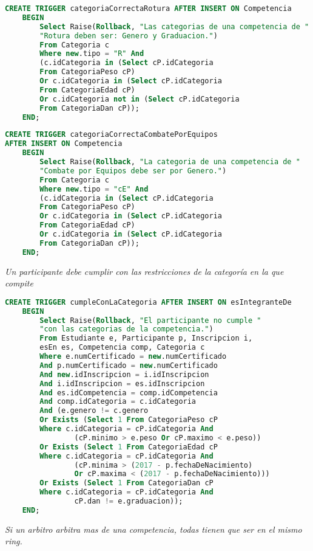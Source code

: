 \begin{lstlisting}[language=SQL]
CREATE TRIGGER categoriaCorrectaRotura AFTER INSERT ON Competencia
    BEGIN
        Select Raise(Rollback, "Las categorias de una competencia de "
        "Rotura deben ser: Genero y Graduacion.")
        From Categoria c
        Where new.tipo = "R" And
        (c.idCategoria in (Select cP.idCategoria 
        From CategoriaPeso cP)
        Or c.idCategoria in (Select cP.idCategoria 
        From CategoriaEdad cP)
        Or c.idCategoria not in (Select cP.idCategoria 
        From CategoriaDan cP));
    END;

\end{lstlisting}
\emph{
}

\begin{lstlisting}[language=SQL]
CREATE TRIGGER categoriaCorrectaCombatePorEquipos 
AFTER INSERT ON Competencia
    BEGIN
        Select Raise(Rollback, "La categoria de una competencia de "
        "Combate por Equipos debe ser por Genero.")
        From Categoria c
        Where new.tipo = "cE" And
        (c.idCategoria in (Select cP.idCategoria 
        From CategoriaPeso cP)
        Or c.idCategoria in (Select cP.idCategoria 
        From CategoriaEdad cP)
        Or c.idCategoria in (Select cP.idCategoria 
        From CategoriaDan cP));
    END;

\end{lstlisting}

\emph{Un participante debe cumplir con las restricciones de la categoría en la que compite}

\begin{lstlisting}[language=SQL]
CREATE TRIGGER cumpleConLaCategoria AFTER INSERT ON esIntegranteDe
    BEGIN
        Select Raise(Rollback, "El participante no cumple "
        "con las categorias de la competencia.")
        From Estudiante e, Participante p, Inscripcion i, 
        esEn es, Competencia comp, Categoria c
        Where e.numCertificado = new.numCertificado 
        And p.numCertificado = new.numCertificado 
        And new.idInscripcion = i.idInscripcion 
        And i.idInscripcion = es.idInscripcion 
        And es.idCompetencia = comp.idCompetencia 
        And comp.idCategoria = c.idCategoria
        And (e.genero != c.genero
        Or Exists (Select 1 From CategoriaPeso cP 
        Where c.idCategoria = cP.idCategoria And 
                (cP.minimo > e.peso Or cP.maximo < e.peso))
        Or Exists (Select 1 From CategoriaEdad cP 
        Where c.idCategoria = cP.idCategoria And 
                (cP.minima > (2017 - p.fechaDeNacimiento) 
                Or cP.maxima < (2017 - p.fechaDeNacimiento)))
        Or Exists (Select 1 From CategoriaDan cP 
        Where c.idCategoria = cP.idCategoria And 
                cP.dan != e.graduacion));
    END;

\end{lstlisting}
\emph{
  Si un arbitro arbitra mas de una competencia, todas tienen que ser en el mismo ring.
}


